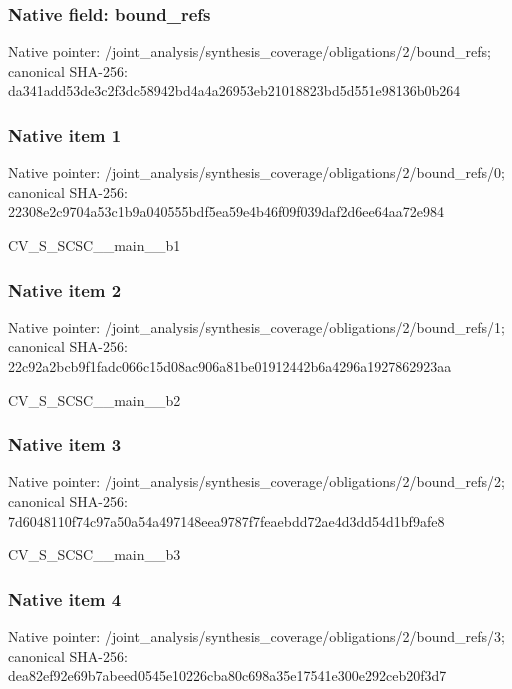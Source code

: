 \documentclass[10pt,a4paper]{article}
\begin{document}
\subsubsection{Native field: bound\_refs}


Native pointer: /joint\_analysis/synthesi\allowbreak{}s\_coverage/obligations/2\allowbreak{}/bound\_refs; canonical SHA-256: da341add53de3c2f3dc58942\allowbreak{}bd4a4a26953eb21018823bd5\allowbreak{}d551e98136b0b264



\subsubsection{Native item 1}


Native pointer: /joint\_analysis/synthesi\allowbreak{}s\_coverage/obligations/2\allowbreak{}/bound\_refs/0; canonical SHA-256: 22308e2c9704a53c1b9a0405\allowbreak{}55bdf5ea59e4b46f09f039da\allowbreak{}f2d6ee64aa72e984


CV\_S\_SCSC\_\_main\_\_b1


\subsubsection{Native item 2}


Native pointer: /joint\_analysis/synthesi\allowbreak{}s\_coverage/obligations/2\allowbreak{}/bound\_refs/1; canonical SHA-256: 22c92a2bcb9f1fadc066c15d\allowbreak{}08ac906a81be01912442b6a4\allowbreak{}296a1927862923aa


CV\_S\_SCSC\_\_main\_\_b2


\subsubsection{Native item 3}


Native pointer: /joint\_analysis/synthesi\allowbreak{}s\_coverage/obligations/2\allowbreak{}/bound\_refs/2; canonical SHA-256: 7d6048110f74c97a50a54a49\allowbreak{}7148eea9787f7feaebdd72ae\allowbreak{}4d3dd54d1bf9afe8


CV\_S\_SCSC\_\_main\_\_b3


\subsubsection{Native item 4}


Native pointer: /joint\_analysis/synthesi\allowbreak{}s\_coverage/obligations/2\allowbreak{}/bound\_refs/3; canonical SHA-256: dea82ef92e69b7abeed0545e\allowbreak{}10226cba80c698a35e17541e\allowbreak{}300e292ceb20f3d7
\end{document}
